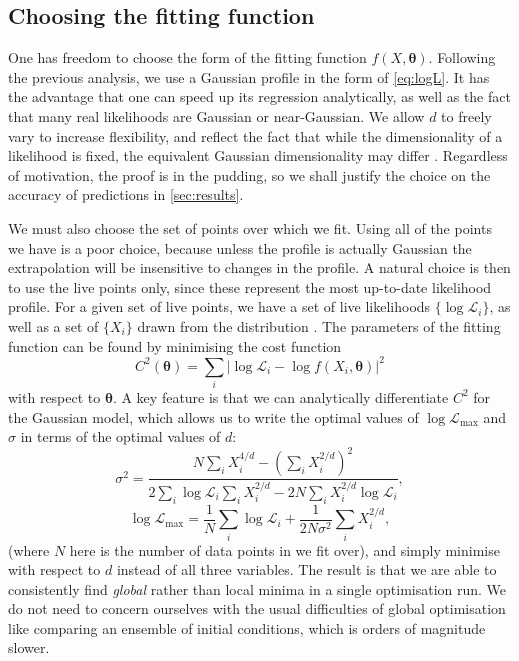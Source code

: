 \documentclass[usenatbib]{mnras}
\newcommand{\logL}{\{ \log \Like_i \}}
\newcommand{\thetab}{\bm{\theta}}
\newcommand{\logLm}{\log \Like_\mathrm{max}}
\newcommand{\set}[1]{\{#1\}}
\newcommand{\Like}{\mathcal{L}}
\begin{document}
\subsection{Choosing the fitting function}
One has freedom to choose the form of the fitting function $f(X, \thetab)$. Following the previous analysis, we use a Gaussian profile in the form of \cref{eq:logL}. It has the advantage that one can speed up its regression analytically, as well as the fact that many real likelihoods are Gaussian or near-Gaussian. We allow $d$ to freely vary to increase flexibility, and reflect the fact that while the dimensionality of a likelihood is fixed, the equivalent Gaussian dimensionality may differ \citep{Handley_2019}. Regardless of motivation, the proof is in the pudding, so we shall justify the choice on the accuracy of predictions in \cref{sec:results}.
\par
We must also choose the set of points over which we fit. Using all of the points we have is a poor choice, because unless the profile is actually Gaussian the extrapolation will be insensitive to changes in the profile. A natural choice is then to use the live points only, since these represent the most up-to-date likelihood profile. For a given set of live points, we have a set of live likelihoods $\logL$, as well as a set of $\set{X_i}$ drawn from the distribution . The parameters of the fitting function can be found by minimising the cost function
\begin{equation}\label{chi squared}
	C^2(\thetab) = \sum_i \left| \log \Like_i - \log f(X_i, \thetab) \right| ^2
\end{equation}
with respect to $\thetab$. A key feature is that we can analytically differentiate  $C^2$ for the Gaussian model, which allows us to write the optimal values of $\logLm$ and $\sigma$ in terms of the optimal values of $d$:
\begin{equation}\label{eq:sigma}
    \sigma^2 = \frac{N \sum_i X_i^{4/d} - \left(\sum_i X_i^{2/d}\right)^2}{2 \sum_i \log \Like_i \sum_i X_i^{2/d} - 2N \sum_i X_i^{2/d}\log \Like_i },
\end{equation}
\begin{equation}\label{eq:logLm}
    \logLm = \frac{1}{N} \sum_i \log \mathcal{L}_i + \frac{1}{2N\sigma^2} \sum_i X_i^{2/d},
\end{equation}
(where $N$ here is the number of data points in we fit over), and simply minimise with respect to $d$ instead of all three variables. The result is that we are able to consistently find \textit{global} rather than local minima in a single optimisation run. We do not need to concern ourselves with the usual difficulties of global optimisation like comparing an ensemble of initial conditions, which is orders of magnitude slower.
\end{document}

